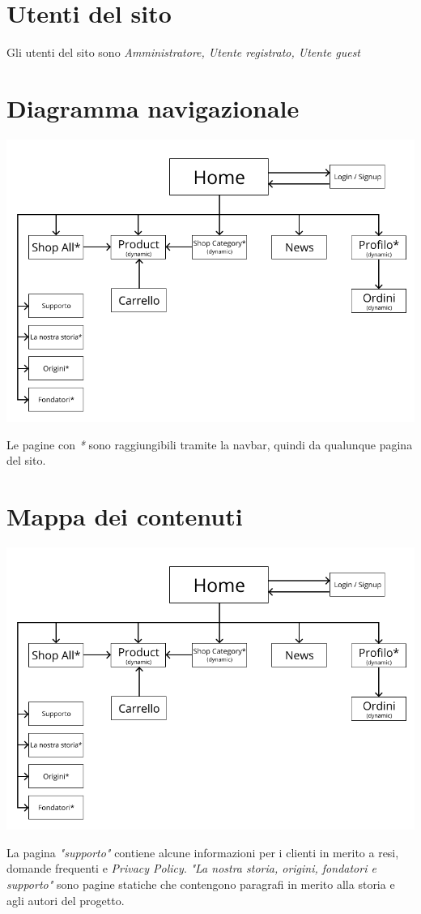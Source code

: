\documentclass{article}
\begin{document}
\begin{large}
    \section{Utenti del sito}
    Gli utenti del sito sono \textit{Amministratore, Utente registrato, Utente guest}
    \section{Diagramma navigazionale}
        \begin{center}
            \includegraphics[scale=0.5]{teraware/_diagnavigazionale.png}
        \end{center} 
        Le pagine con \textit{*} sono raggiungibili tramite la navbar, quindi da qualunque pagina del sito.
    \section{Mappa dei contenuti}
        \begin{center}
            \includegraphics[scale=0.5]{teraware/_diagnavigazionale.png}
        \end{center}
        La pagina \textit{"supporto"} contiene alcune informazioni per i clienti in merito a resi, domande frequenti e \textit{Privacy Policy}. \textit{"La nostra storia, origini, fondatori e supporto"} sono pagine statiche che contengono paragrafi in merito alla storia e agli autori del progetto.

\end{large}
\end{document}

